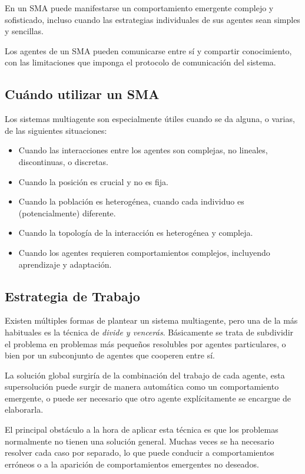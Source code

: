 En un SMA puede manifestarse un comportamiento emergente complejo y sofisticado,
incluso cuando las estrategias individuales de sus agentes sean simples y
sencillas.

Los agentes de un SMA pueden comunicarse entre sí y compartir conocimiento, con
las limitaciones que imponga el protocolo de comunicación del sistema.

\subsection{Cuándo utilizar un SMA}

Los sistemas multiagente son especialmente útiles cuando se da alguna, o varias,
de las siguientes situaciones\cite{Bonabeau02}:

\begin{itemize}
 \item Cuando las interacciones entre los agentes son complejas, no lineales,
 discontinuas, o discretas.
 \item Cuando la posición es crucial y no es fija.
 \item Cuando la población es heterogénea, cuando cada individuo es
 (potencialmente) diferente.
 \item Cuando la topología de la interacción es heterogénea y compleja.
 \item Cuando los agentes requieren comportamientos complejos, incluyendo
 aprendizaje y adaptación.
\end{itemize}

\subsection{Estrategia de Trabajo}

Existen múltiples formas de plantear un sistema multiagente, pero una de la más
habituales es la técnica de {\em divide y vencerás}. Básicamente se trata de
subdividir el problema en problemas más pequeños resolubles por agentes
particulares, o bien por un subconjunto de agentes que cooperen entre sí.

La solución global surgiría de la combinación del trabajo de cada agente, esta
supersolución puede surgir de manera automática como un comportamiento
emergente, o puede ser necesario que otro agente explícitamente se encargue de
elaborarla.

El principal obstáculo a la hora de aplicar esta técnica es que los problemas
normalmente no tienen una solución general. Muchas veces se ha necesario
resolver cada caso por separado, lo que puede conducir a comportamientos
erróneos o a la aparición de comportamientos emergentes no deseados.

